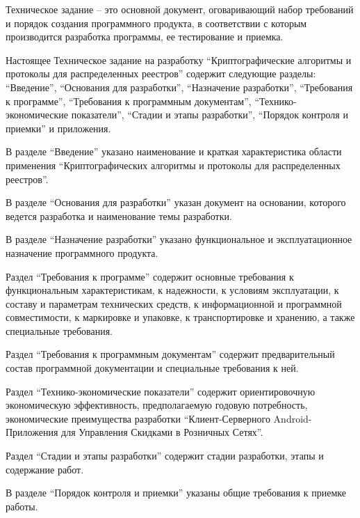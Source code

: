 \tab[0.75cm] Техническое задание – это основной документ, оговаривающий набор требований и
порядок создания программного продукта, в соответствии с которым производится разработка
программы, ее тестирование и приемка.

Настоящее Техническое задание на разработку ``Криптографические алгоритмы и протоколы для распределенных реестров'' содержит
следующие разделы: ``Введение'', ``Основания для разработки'', ``Назначение
разработки'', ``Требования к программе'', ``Требования к программным
документам'', ``Технико-экономические показатели'', ``Стадии и этапы
разработки'', ``Порядок контроля и приемки'' и приложения.

В разделе ``Введение'' указано наименование и краткая характеристика области применения
``Криптографических алгоритмы и протоколы для распределенных реестров''.

В разделе ``Основания для разработки'' указан документ на основании, которого ведется
разработка и наименование темы разработки.

В разделе ``Назначение разработки'' указано функциональное и эксплуатационное
назначение программного продукта.

Раздел ``Требования к программе'' содержит основные требования к функциональным
характеристикам, к надежности, к условиям эксплуатации, к составу и параметрам технических
средств, к информационной и программной совместимости, к маркировке и упаковке, к
транспортировке и хранению, а также специальные требования.

Раздел ``Требования к программным документам'' содержит предварительный состав
программной документации и специальные требования к ней.

Раздел ``Технико-экономические показатели'' содержит ориентировочную экономическую
эффективность, предполагаемую годовую потребность, экономические преимущества разработки
``Клиент-Серверного Android-Приложения для Управления Скидками в Розничных Сетях''.

Раздел ``Стадии и этапы разработки'' содержит стадии разработки, этапы и содержание
работ.

В разделе ``Порядок контроля и приемки'' указаны общие требования к приемке работы.


